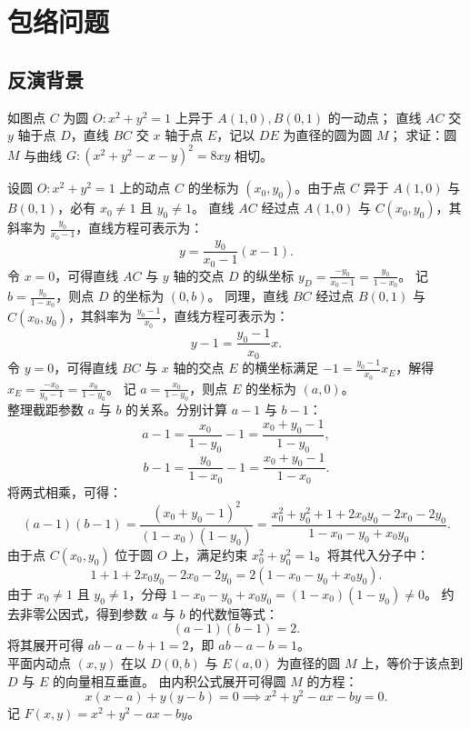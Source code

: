 \chapter{包络问题}
\section{反演背景}
\begin{example}
如图点 \(C\) 为圆 \(O: x^2 + y^2 = 1\) 上异于 \(A(1,0), B(0,1)\) 的一动点；
直线 \(AC\) 交 \(y\) 轴于点 \(D\)，直线 \(BC\) 交 \(x\) 轴于点 \(E\)，记以 \(DE\) 为直径的圆为圆 \(M\)； 求证：圆 \(M\) 与曲线 \(G: (x^2 + y^2 - x - y)^2 = 8xy\) 相切。
\end{example}
\begin{solution}
设圆 $O: x^2 + y^2 = 1$ 上的动点 $C$ 的坐标为 $(x_0, y_0)$。由于点 $C$ 异于 $A(1,0)$ 与 $B(0,1)$，必有 $x_0 \neq 1$ 且 $y_0 \neq 1$。
直线 $AC$ 经过点 $A(1,0)$ 与 $C(x_0, y_0)$，其斜率为 $\frac{y_0}{x_0 - 1}$，直线方程可表示为：
\[ y = \frac{y_0}{x_0 - 1}(x - 1). \]
令 $x = 0$，可得直线 $AC$ 与 $y$ 轴的交点 $D$ 的纵坐标 $y_D = \frac{-y_0}{x_0 - 1} = \frac{y_0}{1 - x_0}$。
记 $b = \frac{y_0}{1 - x_0}$，则点 $D$ 的坐标为 $(0, b)$。
同理，直线 $BC$ 经过点 $B(0,1)$ 与 $C(x_0, y_0)$，其斜率为 $\frac{y_0 - 1}{x_0}$，直线方程可表示为：
\[ y - 1 = \frac{y_0 - 1}{x_0}x. \]
令 $y = 0$，可得直线 $BC$ 与 $x$ 轴的交点 $E$ 的横坐标满足 $-1 = \frac{y_0 - 1}{x_0}x_E$，解得 $x_E = \frac{-x_0}{y_0 - 1} = \frac{x_0}{1 - y_0}$。
记 $a = \frac{x_0}{1 - y_0}$，则点 $E$ 的坐标为 $(a, 0)$。\\
整理截距参数 $a$ 与 $b$ 的关系。分别计算 $a - 1$ 与 $b - 1$：
\[ a - 1 = \frac{x_0}{1 - y_0} - 1 = \frac{x_0 + y_0 - 1}{1 - y_0}, \]
\[ b - 1 = \frac{y_0}{1 - x_0} - 1 = \frac{x_0 + y_0 - 1}{1 - x_0}. \]
将两式相乘，可得：
\[ (a - 1)(b - 1) = \frac{(x_0 + y_0 - 1)^2}{(1 - x_0)(1 - y_0)} = \frac{x_0^2 + y_0^2 + 1 + 2x_0 y_0 - 2x_0 - 2y_0}{1 - x_0 - y_0 + x_0 y_0}. \]
由于点 $C(x_0, y_0)$ 位于圆 $O$ 上，满足约束 $x_0^2 + y_0^2 = 1$。将其代入分子中：
\[ 1 + 1 + 2x_0 y_0 - 2x_0 - 2y_0 = 2(1 - x_0 - y_0 + x_0 y_0). \]
由于 $x_0 \neq 1$ 且 $y_0 \neq 1$，分母 $1 - x_0 - y_0 + x_0 y_0 = (1 - x_0)(1 - y_0) \neq 0$。
约去非零公因式，得到参数 $a$ 与 $b$ 的代数恒等式：
\[ (a - 1)(b - 1) = 2. \]
将其展开可得 $ab - a - b + 1 = 2$，即 $ab - a - b = 1$。\\
平面内动点 $(x, y)$ 在以 $D(0, b)$ 与 $E(a, 0)$ 为直径的圆 $M$ 上，等价于该点到 $D$ 与 $E$ 的向量相互垂直。
由内积公式展开可得圆 $M$ 的方程：
\[ x(x - a) + y(y - b) = 0 \implies x^2 + y^2 - ax - by = 0. \]
记 $F(x, y) = x^2 + y^2 - ax - by$。

\end{solution}
